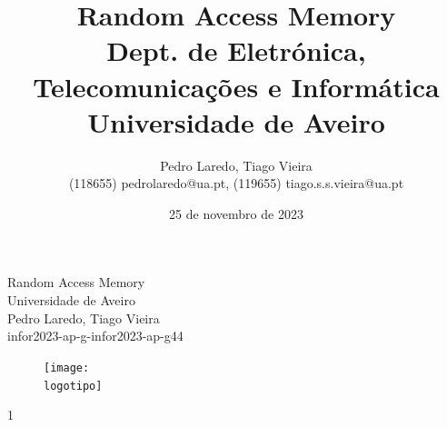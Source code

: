 \documentclass{report}
\begin{document}
%
\def\titulo{Random Access Memory}
\def\data{12 de novembro de 2023}
\def\autores{Pedro Laredo, Tiago Vieira}
\def\autorescontactos{(118655) pedrolaredo@ua.pt, (119655) tiago.s.s.vieira@ua.pt}
\def\repositório{infor2023-ap-g-infor2023-ap-g44}
\def\versao{1}
\def\departamento{Dept. de Eletrónica, Telecomunicações e Informática}
\def\empresa{Universidade de Aveiro}
\def\logotipo{ua.pdf}
%
%
\begin{titlepage}

\begin{center}
%
\vspace*{50mm}
%
{\Huge \titulo}\\ 
%
\vspace{10mm}
%
{\Large \empresa}\\
%
\vspace{10mm}
%
{\LARGE \autores}\\ 
%
{\repositório}
%
\vspace{30mm}
%
\begin{figure}[h]
\center
\texttt{[image: \\logotipo]}
\end{figure}
%
\vspace{30mm}
\end{center}
%
\begin{flushright}
\versao
\end{flushright}
\end{titlepage}

\title{%
{\Huge\textbf{\titulo}}\\
{\Large \departamento\\ \empresa}
}
%
\author{%
    \autores \\
    \autorescontactos
}
%
\date{25 de novembro de 2023}
%
\maketitle

\end{document}
